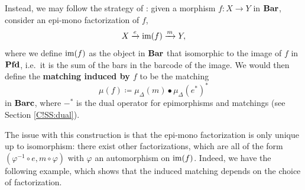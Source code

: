 Instead, we may follow the strategy of \cite{BauerLesnick2015}: given a morphism $f \colon X \to Y$ in $\Bar$, consider an epi-mono factorization of $f$,
\[
  X \xrightarrow{e} \im(f) \xrightarrow{m} Y,
\]
where we define $\im(f)$ as the object in $\Bar$ that isomorphic to the image of $f$ in $\Pfd$, i.e.\ it is the sum of the bars in the barcode of the image. We would then define the \textbf{matching induced by $f$} to be the matching
\begin{equation}
\label{C!E:bad-induced-matching}
  \mu(f) \coloneq \mu_\Delta(m) \bullet \mu_\Delta(e^*)^*
\end{equation}
in $\Barc$, where $-^*$ is the dual operator for epimorphisms and matchings (see Section \ref{C!SS:dual}).

The issue with this construction is that the epi-mono factorization is only unique up to isomorphism: there exist other factorizations, which are all of the form $(\varphi^{-1} \circ e , m \circ \varphi)$ with $\varphi$ an automorphism on $\im(f)$. Indeed, we have the following example, which shows that the induced matching depends on the choice of factorization.

